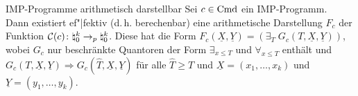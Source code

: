 \linie

\begin{Satz}{IMP-Programme arithmetisch darstellbar}
    Sei $c \in \text{Cmd}$ ein IMP-Programm.\\
    Dann existiert ef"|fektiv (d.\,h. berechenbar) eine arithmetische Darstellung $F_c$ der
    Funktion $\mathcal{C}(c)\colon \natural_0^k \rightarrow_p \natural_0^k$.
    Diese hat die Form $F_c(\underline{X}, \underline{Y}) =
    (\exists_T\; G_c(T, \underline{X}, \underline{Y}))$, wobei $G_c$ nur beschränkte Quantoren
    der Form $\exists_{x \le T}$ und $\forall_{x \le T}$ enthält und
    $G_c(T, \underline{X}, \underline{Y}) \Rightarrow
    G_c(\widehat{T}, \underline{X}, \underline{Y})$
    für alle $\widehat{T} \ge T$ und $\underline{X} = (x_1, \dotsc, x_k)$
    und $\underline{Y} = (y_1, \dotsc, y_k)$.
\end{Satz}


